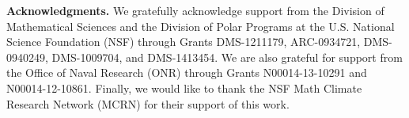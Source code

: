 \documentclass[leqno,onefignum,onetabnum]{siamltex1213}
\begin{document}
\medskip

{\bf Acknowledgments.}
We gratefully acknowledge support from the Division of Mathematical
  Sciences and the Division of Polar Programs at the U.S. National
  Science Foundation (NSF) through Grants DMS-1211179, 
  ARC-0934721, DMS-0940249, DMS-1009704, and DMS-1413454. 
  We are also grateful for support from
  the Office of Naval Research (ONR) through Grants N00014-13-10291 and
  N00014-12-10861. Finally, we would like to thank the NSF Math Climate
  Research Network (MCRN) for their support of this work. 

\medskip






\end{document}
